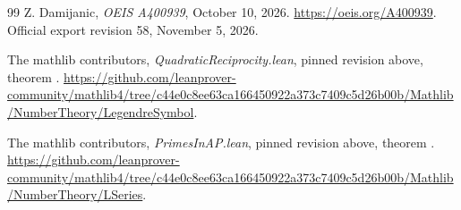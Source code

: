 \documentclass[11pt]{article}
\begin{document}
\begin{thebibliography}{99}
Z. Damijanic, \emph{OEIS A400939}, October 10, 2026.
\url{https://oeis.org/A400939}.
Official export revision 58, November 5, 2026.

The mathlib contributors, \emph{QuadraticReciprocity.lean},
pinned revision above, theorem
.
\url{https://github.com/leanprover-community/mathlib4/tree/c44e0c8ee63ca166450922a373c7409c5d26b00b/Mathlib/NumberTheory/LegendreSymbol}.

The mathlib contributors, \emph{PrimesInAP.lean},
pinned revision above, theorem
.
\url{https://github.com/leanprover-community/mathlib4/tree/c44e0c8ee63ca166450922a373c7409c5d26b00b/Mathlib/NumberTheory/LSeries}.
\end{thebibliography}
\end{document}
